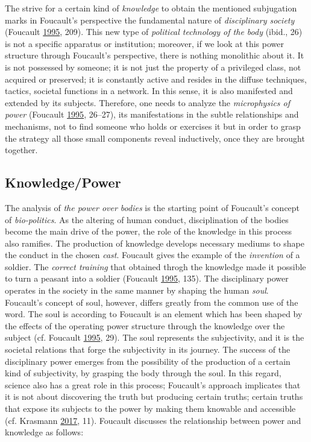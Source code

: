 \documentclass[12pt,twoside]{report}
\begin{document}
The strive for a certain kind of \emph{knowledge} to obtain the mentioned subjugation marks in Foucault's perspective the fundamental nature of \emph{disciplinary society} (Foucault \protect\hyperlink{ref-Foucault1995}{1995}, 209). This new type of \emph{political technology of the body} (ibid., 26) is not a specific apparatus or institution; moreover, if we look at this power structure through Foucault's perspective, there is nothing monolithic about it. It is not possessed by someone; it is not just the property of a privileged class, not acquired or preserved; it is constantly active and resides in the diffuse techniques, tactics, societal functions in a network. In this sense, it is also manifested and extended by its subjects. Therefore, one needs to analyze the \emph{microphysics of power} (Foucault \protect\hyperlink{ref-Foucault1995}{1995}, 26--27), its manifestations in the subtle relationships and mechanisms, not to find someone who holds or exercises it but in order to grasp the strategy all those small components reveal inductively, once they are brought together.

\hypertarget{knowledgepower}{%
\subsection{Knowledge/Power}\label{knowledgepower}}

The analysis of \emph{the power over bodies} is the starting point of Foucault's concept of \emph{bio-politics}. As the altering of human conduct, disciplination of the bodies become the main drive of the power, the role of the knowledge in this process also ramifies. The production of knowledge develops necessary mediums to shape the conduct in the chosen \emph{cast}. Foucault gives the example of the \emph{invention} of a soldier. The \emph{correct training} that obtained throgh the knowledge made it possible to turn a peasant into a soldier (Foucault \protect\hyperlink{ref-Foucault1995}{1995}, 135). The disciplinary power operates in the society in the same manner by shaping the human \emph{soul}. Foucault's concept of soul, however, differs greatly from the common use of the word. The soul is according to Foucault is an element which has been shaped by the effects of the operating power structure through the knowledge over the subject (cf. Foucault \protect\hyperlink{ref-Foucault1995}{1995}, 29). The soul represents the subjectivity, and it is the societal relations that forge the subjectivity in its journey. The success of the disciplinary power emerges from the possibility of the production of a certain kind of subjectivity, by grasping the body through the soul. In this regard, science also has a great role in this process; Foucault's approach implicates that it is not about discovering the truth but producing certain truths; certain truths that expose its subjects to the power by making them knowable and accessible (cf. Krasmann \protect\hyperlink{ref-Krasmann2017}{2017}, 11). Foucault discusses the relationship between power and knowledge as follows:
\end{document}
